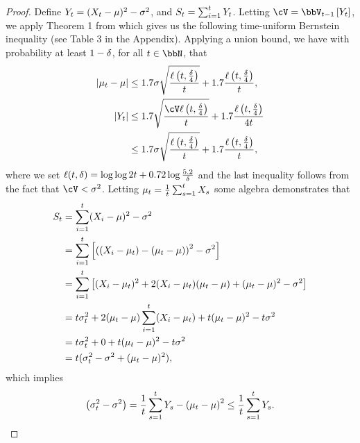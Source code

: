 \begin{proof}
    
    Define $Y_{t} = (X_{t} - \mu)^2 - \sigma^2$, and $S_{t} = \sum_{i = 1}^{t} Y_{t}$.
    Letting \(\cV = \V[\round - 1]{Y_\round}\), we apply Theorem 1 from \cite{Howard2018TimeUniform} which gives us the following time-uniform Bernstein inequality (see Table 3 in the Appendix).
    Applying a union bound, we have with probability at least \(1 - \delta\), for all $\round \in \bbN$, that
    \begin{align}
        \abs{\mean_\round - \mean}
            &\leq 1.7 \stdev \sqrt{\frac{\ell\paren{\round, \frac{\errorProb}{4}}}{\round}} + 1.7 \frac{\ell\paren{\round, \frac{\errorProb}{4}}}{\round}\label{eq:stdev-concentration-mean-concentration}, \\
        \abs{Y_\round} 
            &\leq 1.7 \sqrt{\frac{\cV\ell\paren{\round, \frac{\errorProb}{4}}}{\round}} + 1.7 \frac{\ell\paren{\round, \frac{\errorProb}{4}}}{4\round} \\
            &\leq 1.7 \stdev \sqrt{\frac{\ell\paren{\round, \frac{\errorProb}{4}}}{\round}} + 1.7 \frac{\ell\paren{\round, \frac{\errorProb}{4}}}{\round}\label{eq:stdev-concentration-var-concentration} ,
    \end{align}
    where we set $\ell(t, \delta) = \log\log 2t + 0.72 \log \frac{5.2}{\delta}$ and the last inequality follows from the fact that $\cV < \sigma^2$.
    Letting $\mu_{t} = \frac{1}{t} \sum_{s = 1}^{t} X_{s}$ some algebra demonstrates that
    \begin{align*}
        S_{t} 
            &= \sum_{i = 1}^{t} (X_i - \mu)^2 - \sigma^2 \\
            &= \sum_{i = 1}^{t} \left[\left( (X_i - \mu_{t}) - (\mu_{t} - \mu)\right)^2 - \sigma^2\right] \\
            &= \sum_{i = 1}^{t} \left[(X_i - \mu_{t})^2 + 2 (X_i - \mu_{t}) (\mu_{t} - \mu) + (\mu_{t} - \mu)^2 - \sigma^2\right] \\
            &=  t \sigma_{t}^2 + 2(\mu_{t} - \mu)\sum_{i = 1}^{t}(X_i - \mu_{t}) + t (\mu_{t} - \mu)^2 - t \sigma^2 \\
            &= t \sigma_{t}^2 + 0 + t(\mu_{t} - \mu)^2 - t \sigma^2 \\
            &= t (\sigma_{t}^2 - \sigma^2 + (\mu_{t} - \mu)^2),
    \end{align*}
    which implies
    \begin{equation}
        \left( \sigma_{t}^2 - \sigma^2 \right) = \frac{1}{t}\sum_{s = 1}^{t} Y_{s} - \left( \mu_{t} - \mu \right)^{2} \leq \frac{1}{t}\sum_{s = 1}^{t} Y_{s}.
    \end{equation}
    

\end{proof}

